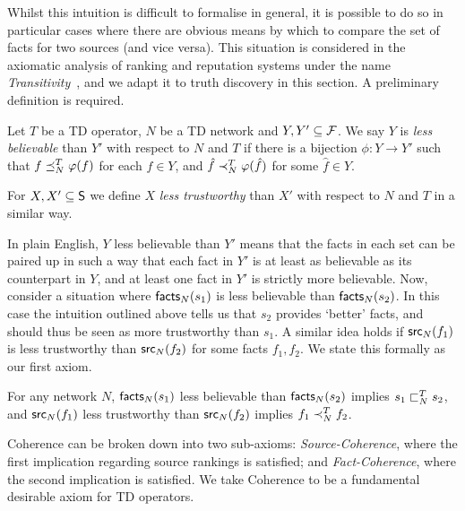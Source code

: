 Whilst this intuition is difficult to formalise in general, it is possible to
do so in particular cases where there are obvious means by which to compare the
set of facts for two sources (and vice versa). This situation is considered in
the axiomatic analysis of ranking and reputation systems under the name
\emph{Transitivity}~\cite{tennenholtz2004,altman2008}, and we adapt it to truth
discovery in this section. A preliminary definition is required.

\begin{definition}
\label{td_def_coherence_less_believable}

Let $T$ be a TD operator, $N$ be a TD network and $Y, Y' \subseteq \F$. We
say $Y$ is \emph{less believable} than $Y'$ with respect to $N$ and $T$
if there is a bijection $\phi: Y \to Y'$ such that $f \fle_N^T \phi(f)$ for
each $f \in Y$, and $\hat{f} \flt_N^T \phi(\hat{f})$ for some $\hat{f} \in Y$.

For $X, X' \subseteq \S$ we define $X$ \emph{less trustworthy} than $X'$ with
respect to $N$ and $T$ in a similar way.

\end{definition}

In plain English, $Y$ less believable than $Y'$ means that the facts in each
set can be paired up in such a way that each fact in $Y'$ is at least as
believable as its counterpart in $Y$, and at least one fact in $Y'$ is strictly
more believable. Now, consider a situation where $\facts_N(s_1)$ is less
believable than $\facts_N(s_2)$. In this case the intuition outlined above
tells us that $s_2$ provides `better' facts, and should thus be seen as more
trustworthy than $s_1$. A similar idea holds if $\src_N(f_1)$ is less
trustworthy than $\src_N(f_2)$ for some facts $f_1, f_2$. We state this
formally as our first axiom.

\begin{axiom}[Coherence]

For any network $N$, $\facts_N(s_1)$ less believable than $\facts_N(s_2)$
implies $s_1 \slt_N^T s_2$, and $\src_N(f_1)$ less trustworthy than
$\src_N(f_2)$ implies $f_1 \flt_N^T f_2$.

\end{axiom}

Coherence can be broken down into two sub-axioms: \emph{Source-Coherence},
where the first implication regarding source rankings is satisfied; and
\emph{Fact-Coherence}, where the second implication is satisfied. We take
Coherence to be a fundamental desirable axiom for TD operators.

